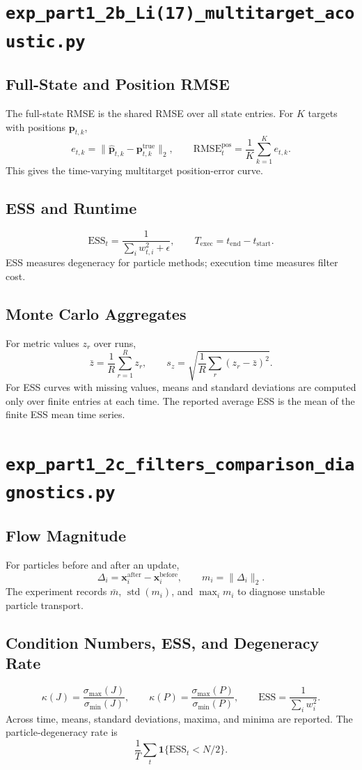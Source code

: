 \documentclass[11pt]{article}
\newcommand{\code}[1]{\texttt{#1}}
\newcommand{\RMSE}{\mathrm{RMSE}}
\newcommand{\ESS}{\mathrm{ESS}}
\newcommand{\ind}{\mathbf{1}}
\begin{document}
\section{\code{exp\_part1\_2b\_Li(17)\_multitarget\_acoustic.py}}
\subsection*{Full-State and Position RMSE}
The full-state RMSE is the shared RMSE over all state entries. For \(K\) targets with positions \(\bm p_{t,k}\),
\[
e_{t,k}=\|\hat{\bm p}_{t,k}-\bm p^{\mathrm{true}}_{t,k}\|_2,\qquad
\RMSE_t^{\mathrm{pos}}=\frac{1}{K}\sum_{k=1}^{K}e_{t,k}.
\]
This gives the time-varying multitarget position-error curve.

\subsection*{ESS and Runtime}
\[
\ESS_t=\frac{1}{\sum_iw_{t,i}^2+\epsilon},\qquad
T_{\mathrm{exec}}=t_{\mathrm{end}}-t_{\mathrm{start}}.
\]
ESS measures degeneracy for particle methods; execution time measures filter cost.

\subsection*{Monte Carlo Aggregates}
For metric values \(z_r\) over runs,
\[
\bar z=\frac{1}{R}\sum_{r=1}^Rz_r,\qquad
s_z=\sqrt{\frac{1}{R}\sum_r(z_r-\bar z)^2}.
\]
For ESS curves with missing values, means and standard deviations are computed only over finite entries at each time. The reported average ESS is the mean of the finite ESS mean time series.

\section{\code{exp\_part1\_2c\_filters\_comparison\_diagnostics.py}}
\subsection*{Flow Magnitude}
For particles before and after an update,
\[
\Delta_i=\bm x^{\mathrm{after}}_i-\bm x^{\mathrm{before}}_i,\qquad
m_i=\|\Delta_i\|_2.
\]
The experiment records \(\bar m\), \(\operatorname{std}(m_i)\), and \(\max_i m_i\) to diagnose unstable particle transport.

\subsection*{Condition Numbers, ESS, and Degeneracy Rate}
\[
\kappa(J)=\frac{\sigma_{\max}(J)}{\sigma_{\min}(J)},\qquad
\kappa(P)=\frac{\sigma_{\max}(P)}{\sigma_{\min}(P)},\qquad
\ESS=\frac{1}{\sum_iw_i^2}.
\]
Across time, means, standard deviations, maxima, and minima are reported. The particle-degeneracy rate is
\[
\frac{1}{T}\sum_t\ind\{\ESS_t<N/2\}.
\]
\end{document}
